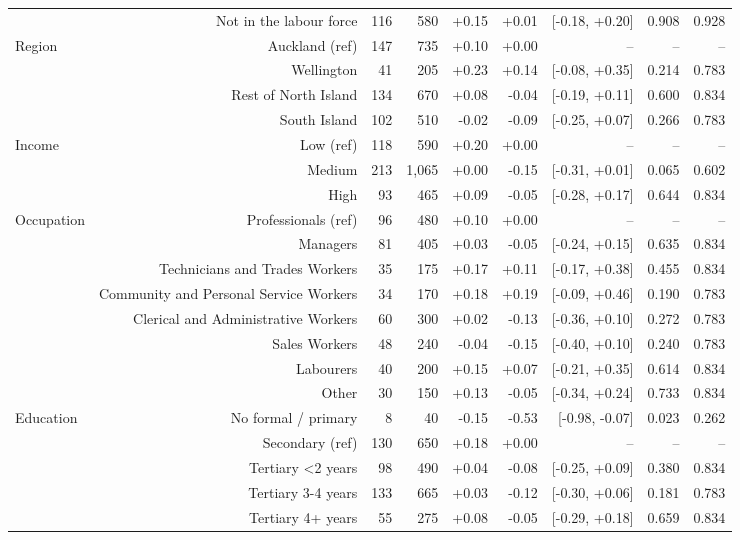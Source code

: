 {\begin{tabular}{lrrrrrrrr}
 & Not in the labour force & 116 & 580 & +0.15 & +0.01 & [-0.18, +0.20] & 0.908 & 0.928 \\
Region & Auckland (ref) & 147 & 735 & +0.10 & +0.00 & -- & -- & -- \\
 & Wellington & 41 & 205 & +0.23 & +0.14 & [-0.08, +0.35] & 0.214 & 0.783 \\
 & Rest of North Island & 134 & 670 & +0.08 & -0.04 & [-0.19, +0.11] & 0.600 & 0.834 \\
 & South Island & 102 & 510 & -0.02 & -0.09 & [-0.25, +0.07] & 0.266 & 0.783 \\
Income & Low (ref) & 118 & 590 & +0.20 & +0.00 & -- & -- & -- \\
 & Medium & 213 & 1,065 & +0.00 & -0.15 & [-0.31, +0.01] & 0.065 & 0.602 \\
 & High & 93 & 465 & +0.09 & -0.05 & [-0.28, +0.17] & 0.644 & 0.834 \\
Occupation & Professionals (ref) & 96 & 480 & +0.10 & +0.00 & -- & -- & -- \\
 & Managers & 81 & 405 & +0.03 & -0.05 & [-0.24, +0.15] & 0.635 & 0.834 \\
 & Technicians and Trades Workers & 35 & 175 & +0.17 & +0.11 & [-0.17, +0.38] & 0.455 & 0.834 \\
 & Community and Personal Service Workers & 34 & 170 & +0.18 & +0.19 & [-0.09, +0.46] & 0.190 & 0.783 \\
 & Clerical and Administrative Workers & 60 & 300 & +0.02 & -0.13 & [-0.36, +0.10] & 0.272 & 0.783 \\
 & Sales Workers & 48 & 240 & -0.04 & -0.15 & [-0.40, +0.10] & 0.240 & 0.783 \\
 & Labourers & 40 & 200 & +0.15 & +0.07 & [-0.21, +0.35] & 0.614 & 0.834 \\
 & Other & 30 & 150 & +0.13 & -0.05 & [-0.34, +0.24] & 0.733 & 0.834 \\
Education & No formal / primary & 8 & 40 & -0.15 & -0.53 & [-0.98, -0.07] & 0.023 & 0.262 \\
 & Secondary (ref) & 130 & 650 & +0.18 & +0.00 & -- & -- & -- \\
 & Tertiary <2 years & 98 & 490 & +0.04 & -0.08 & [-0.25, +0.09] & 0.380 & 0.834 \\
 & Tertiary 3-4 years & 133 & 665 & +0.03 & -0.12 & [-0.30, +0.06] & 0.181 & 0.783 \\
 & Tertiary 4+ years & 55 & 275 & +0.08 & -0.05 & [-0.29, +0.18] & 0.659 & 0.834 \\
\bottomrule
\end{tabular}
}%